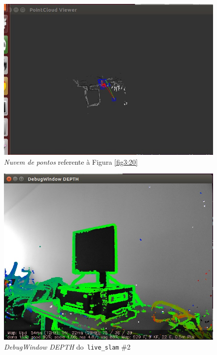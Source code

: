 \begin{figure}[H]
	\centering
		\includegraphics[width= \textwidth]{Imagens/figura3-21.jpg}
	\caption{\textit{Nuvem de pontos} referente à Figura \ref{fig3:20}}
	\label{fig3:21}
\end{figure}

\begin{figure}[H]
	\centering
		\includegraphics[width= \textwidth]{Imagens/figura3-22.jpg}
	\caption{\textit{DebugWindow DEPTH} do\texttt{ live\_slam} \#2}
	\label{fig3:22}
\end{figure}

